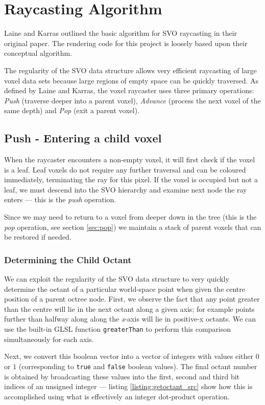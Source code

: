 \section{Raycasting Algorithm}
Laine and Karras outlined the basic algorithm for SVO raycasting in their original paper. The rendering code for this project is loosely based upon their conceptual algorithm.

The regularity of the SVO data structure allows very efficient raycasting of large voxel data sets because large regions of empty space can be quickly traversed. As defined by Laine and Karras, the voxel raycaster uses three primary operations: \textit{Push} (traverse deeper into a parent voxel), \textit{Advance} (process the next voxel of the same depth) and \textit{Pop} (exit a parent voxel). 

\subsection{Push - Entering a child voxel}
When the raycaster encounters a non-empty voxel, it will first check if the voxel is a leaf. Leaf voxels do not require any further traversal and can be coloured immediately, terminating the ray for this pixel. If the voxel is occupied but not a leaf, we must descend into the SVO hierarchy and examine next node the ray enters --- this is the \textit{push} operation.

Since we may need to return to a voxel from deeper down in the tree (this is the \textit{pop} operation, see section \ref{sec:pop}) we maintain a stack of parent voxels that can be restored if needed.

\subsubsection{Determining the Child Octant}
We can exploit the regularity of the SVO data structure to very quickly determine the octant of a particular world-space point when given the centre position of a parent octree node. First, we observe the fact that any point greater than the centre will lie in the next octant along a given axis; for example points further than halfway along along the \textit{x}-axis will lie in positive-x octants. We can use the built-in GLSL function \texttt{greaterThan} to perform this comparison simultaneously for each axis.

Next, we convert this boolean vector into a vector of integers with values either $0$ or $1$ (corresponding to \texttt{true} and \texttt{false} boolean values). The final octant number is obtained by broadcasting these values into the first, second and third bit indices of an unsigned integer --- listing \ref{listing:getoctant_src} show how this is accomplished using what is effectively an integer dot-product operation. 

